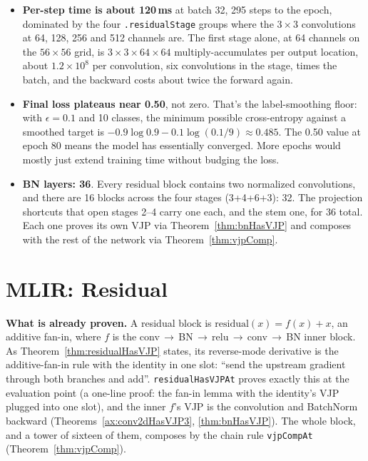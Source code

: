 \begin{itemize}
\item \textbf{Per-step time is about 120\,ms} at batch 32, 295 steps to the
  epoch, dominated by the four \texttt{.residualStage} groups where the
  $3 \times 3$ convolutions at 64, 128, 256 and 512 channels are. The first
  stage alone, at 64 channels on the $56 \times 56$ grid, is
  $3 \times 3 \times 64 \times 64$ multiply-accumulates per output location,
  about $1.2 \times 10^8$ per convolution, six convolutions in the stage,
  times the batch, and the backward costs about twice the forward again.

\item \textbf{Final loss plateaus near 0.50}, not zero. That's the
  label-smoothing floor: with $\epsilon = 0.1$ and 10 classes, the
  minimum possible cross-entropy against a smoothed target is
  $-0.9 \log 0.9 - 0.1 \log (0.1/9) \approx 0.485$. The 0.50 value
  at epoch 80 means the model has essentially converged. More
  epochs would mostly just extend training time without budging the
  loss.

\item \textbf{BN layers: 36}. Every residual block contains two normalized
  convolutions, and there are 16 blocks across the four stages
  (3+4+6+3): 32. The projection shortcuts that open stages 2--4 carry
  one each, and the stem one, for 36 total. Each one proves its own VJP
  via Theorem~\ref{thm:bnHasVJP} and composes with the rest of the
  network via Theorem~\ref{thm:vjpComp}.
\end{itemize}

\section{MLIR: Residual}

\noindent\textbf{What is already proven.} A residual block is
$\mathrm{residual}(x) = f(x) + x$, an additive fan-in, where $f$ is the
conv\,$\to$\,BN\,$\to$\,relu\,$\to$\,conv\,$\to$\,BN inner block. As
Theorem~\ref{thm:residualHasVJP} states, its reverse-mode derivative is
the additive-fan-in rule with the identity in one slot: ``send the
upstream gradient through both branches and add''.
\texttt{residualHasVJPAt} proves exactly this at the evaluation point
(a one-line proof: the fan-in lemma with the identity's VJP plugged into
one slot), and the inner $f$'s VJP is the convolution and BatchNorm backward
(Theorems~\ref{ax:conv2dHasVJP3}, \ref{thm:bnHasVJP}). The
whole block, and a tower of sixteen of them, composes by the chain
rule \texttt{vjpCompAt} (Theorem~\ref{thm:vjpComp}).

